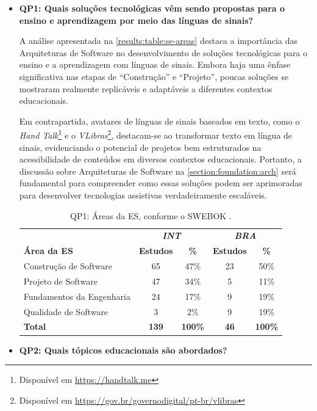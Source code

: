 \begin{itemize}

\item \textbf{QP1: Quais soluções tecnológicas vêm sendo propostas para o ensino e aprendizagem por meio das línguas de sinais?}

A análise apresentada na \autoref{results:table:se-areas} destaca a importância das Arquiteturas de Software no desenvolvimento de soluções tecnológicas para o ensino e a aprendizagem com línguas de sinais. Embora haja uma ênfase significativa nas etapas de ``Construção'' e ``Projeto'', poucas soluções se mostraram realmente replicáveis e adaptáveis a diferentes contextos educacionais. 

Em contrapartida, avatares de línguas de sinais baseados em texto, como o \textit{Hand Talk}\footnote{Disponível em \url{https://handtalk.me}} e o \textit{VLibras}\footnote{Disponível em \url{https://gov.br/governodigital/pt-br/vlibras}}, destacam-se ao transformar texto em língua de sinais, evidenciando o potencial de projetos bem estruturados na acessibilidade de conteúdos em diversos contextos educacionais. Portanto, a discussão sobre Arquiteturas de Software na \autoref{section:foundation:arch} será fundamental para compreender como essas soluções podem ser aprimoradas para desenvolver tecnologias assistivas verdadeiramente escaláveis.

\begin{table}[htbp]
\caption{QP1: Áreas da ES, conforme o SWEBOK \cite{Bourque2014}.}
\label{results:table:se-areas}
\centering
\begin{tabular}{lcccc}
\hline
 & \multicolumn{2}{c}{\textit{\textbf{INT}}} & \multicolumn{2}{c}{\textit{\textbf{BRA}}} \\ \cline{2-5} 
\textbf{Área da ES} & \textbf{Estudos} & \textbf{\%} & \textbf{Estudos} & \textbf{\%} \\ \hline
Construção de Software & 65 & 47\% & 23 & 50\% \\
Projeto de Software & 47 & 34\% & 5 & 11\% \\
Fundamentos da Engenharia & 24 & 17\% & 9 & 19\% \\
Qualidade de Software & 3 & 2\% & 9 & 19\% \\
\textbf{Total} & \textbf{139} & \textbf{100\%} & \textbf{46} & \textbf{100\%} \\ \hline
\end{tabular}
\end{table}

\item \textbf{QP2: Quais tópicos educacionais são abordados?}


\end{itemize}
